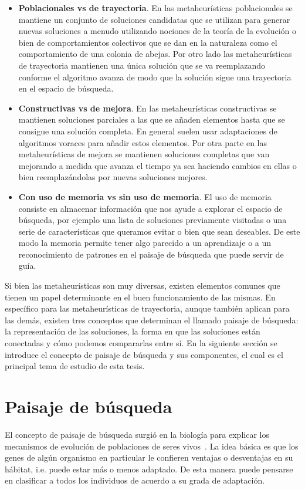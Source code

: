\begin{itemize}
    \item \textbf{Poblacionales vs de trayectoria}. En las metaheurísticas poblacionales se mantiene un conjunto de soluciones candidatas que se utilizan para generar nuevas soluciones a menudo utilizando nociones de la teoría de la evolución o bien de comportamientos colectivos que se dan en la naturaleza como el comportamiento de una colonia de abejas. Por otro lado las metaheurísticas de trayectoria mantienen una única solución que se va reemplazando conforme el algoritmo avanza de modo que la solución sigue una trayectoria en el espacio de búsqueda.
    \item \textbf{Constructivas vs de mejora}. En las metaheurísticas constructivas se mantienen soluciones parciales a las que se añaden elementos hasta que se consigue una solución completa. En general suelen usar adaptaciones de algoritmos voraces para añadir estos elementos. Por otra parte en las metaheurísticas de mejora se mantienen soluciones completas que van mejorando a medida que avanza el tiempo ya sea haciendo cambios en ellas o bien reemplazándolas por nuevas soluciones mejores.
    \item \textbf{Con uso de memoria vs sin uso de memoria}. El uso de memoria consiste en almacenar información que nos ayude a explorar el espacio de búsqueda, por ejemplo una lista de soluciones previamente visitadas o una serie de características que queramos evitar o bien que sean deseables. De este modo la memoria permite tener algo parecido a un aprendizaje o a un reconocimiento de patrones en el paisaje de búsqueda que puede servir de guía.
\end{itemize} 

Si bien las metaheurísticas son muy diversas, existen elementos comunes que tienen un papel determinante en el buen funcionamiento de las mismas. 
%
En específico para las metaheurísticas de trayectoria, aunque también aplican para las demás, existen tres conceptos que determinan el llamado paisaje de búsqueda: 
la representación de las soluciones, la forma en que las soluciones están conectadas y cómo podemos compararlas entre sí. 
%
En la siguiente sección se introduce el concepto de paisaje de búsqueda y sus componentes, el cual es el principal tema de estudio de esta tesis.

\section{Paisaje de búsqueda}
El concepto de paisaje de búsqueda surgió en la biología para explicar los mecanismos de evolución de poblaciones de seres vivos~\cite{wright1932roles}. 
%
La idea básica es que los genes de algún organismo en particular le confieren ventajas o desventajas en su hábitat, i.e. puede estar más o menos adaptado. 
%
De esta manera puede pensarse en clasificar a todos los individuos de acuerdo a su grada de adaptación. 

